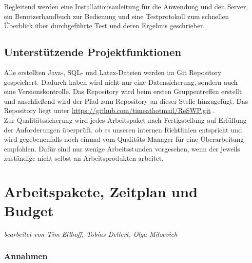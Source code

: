 \documentclass[fontsize=12pt,paper=a4,twoside]{scrartcl}
\begin{document}
Begleitend werden eine Installationsanleitung für die Anwendung und den Server, ein Benutzerhandbuch zur Bedienung und eine Testprotokoll zum schnellen Überblick über durchgeführte Test und deren Ergebnis geschrieben.

\subsection{Unterstützende Projektfunktionen}

Alle erstellten Java-, SQL- und Latex-Dateien werden im Git Repository gespeichert. Dadurch haben wird nicht nur eine Datensicherung, sondern auch eine Versionskontrolle. Das Repository wird beim ersten Gruppentreffen erstellt und anschließend wird der Pfad zum Repository an dieser Stelle hinzugefügt. Das Repository liegt unter \url{https://github.com/timeathotmail/ReSWP.git} .\\
Zur Qualitätssicherung wird jedes Arbeitspaket nach Fertigstellung auf Erfüllung der Anforderungen überprüft, ob es unseren internen Richtlinien entspricht und wird gegebenenfalls noch einmal vom Qualitäts-Manager für eine Überarbeitung empfohlen. Dafür sind nur wenige Arbeitsstunden vorgesehen, wenn der jeweils zuständige nicht selbst an Arbeitsprodukten arbeitet.



\section{Arbeitspakete, Zeitplan und Budget}

\textit{bearbeitet von Tim Ellhoff, Tobias Dellert, Olga Miloevich}

\subsubsection{Annahmen}\label{aps}
\end{document}
